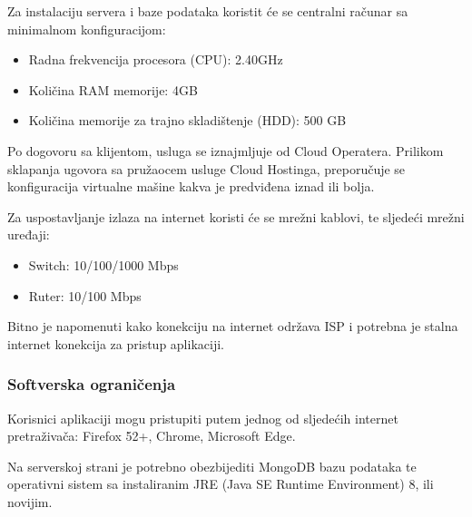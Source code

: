 Za instalaciju servera i baze podataka koristit će se centralni računar sa minimalnom konfiguracijom:

\begin{itemize}
    \item Radna frekvencija procesora (CPU): 2.40GHz
    \item Količina RAM memorije: 4GB
    \item Količina memorije za trajno skladištenje (HDD): 500 GB
\end{itemize}

Po dogovoru sa klijentom, usluga se iznajmljuje od Cloud Operatera. Prilikom sklapanja ugovora sa pružaocem usluge Cloud Hostinga, preporučuje se konfiguracija virtualne mašine kakva je predviđena iznad ili bolja.

Za uspostavljanje izlaza na internet koristi će se mrežni kablovi, te sljedeći mrežni uređaji:
\begin{itemize}
  \item Switch: 10/100/1000 Mbps
  \item Ruter: 10/100 Mbps
\end{itemize}

Bitno je napomenuti kako konekciju na internet održava ISP i potrebna je stalna internet konekcija za pristup aplikaciji.
\subsubsection{Softverska ograničenja}
Korisnici aplikaciji mogu pristupiti putem jednog od sljedećih internet pretraživača: Firefox 52+, Chrome, Microsoft Edge.

Na serverskoj strani je potrebno obezbijediti MongoDB bazu podataka te operativni sistem sa instaliranim JRE (Java SE Runtime Environment) 8, ili novijim.

